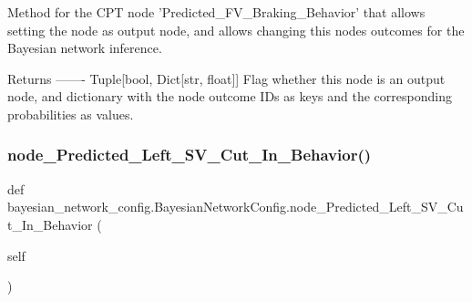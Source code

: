 \begin{DoxyVerb}Method for the CPT node 'Predicted_FV_Braking_Behavior' that allows setting the node as output node,
and allows changing this nodes outcomes for the Bayesian network inference.

Returns
-------
Tuple[bool, Dict[str, float]]
    Flag whether this node is an output node, and dictionary with the node outcome IDs as keys
    and the corresponding probabilities as values.
\end{DoxyVerb}
 \mbox{\label{classbayesian__network__config_1_1_bayesian_network_config_abb5410a7bd4f2c2fe9cb04057d9c5e34}} 
\subsubsection{\texorpdfstring{node\+\_\+\+Predicted\+\_\+\+Left\+\_\+\+S\+V\+\_\+\+Cut\+\_\+\+In\+\_\+\+Behavior()}{node\_Predicted\_Left\_SV\_Cut\_In\_Behavior()}}
{\footnotesize\ttfamily def bayesian\+\_\+network\+\_\+config.\+Bayesian\+Network\+Config.\+node\+\_\+\+Predicted\+\_\+\+Left\+\_\+\+S\+V\+\_\+\+Cut\+\_\+\+In\+\_\+\+Behavior (\begin{DoxyParamCaption}\item[{}]{self }\end{DoxyParamCaption})}

